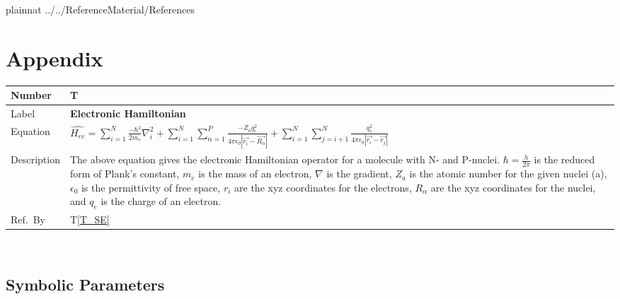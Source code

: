 \documentclass[12pt]{article}
\newcommand{\colAwidth}{0.13\textwidth}
\newcommand{\colBwidth}{0.82\textwidth}
\newcounter{theorynum} %
\newcommand{\tref}[1]{T\ref{#1}}
\begin{document}
\newpage

 {plainnat}
%
 {../../ReferenceMaterial/References}

\newpage

\section{Appendix} \label{appendix}


\noindent
\begin{minipage}{\textwidth}
	\renewcommand*{\arraystretch}{1.5}
	\begin{tabular}{| p{\colAwidth} | p{\colBwidth}|}
		\hline
		\rowcolor[gray]{0.9}
		Number & T{theorynum}\thetheorynum \label{T_HAMEE}\\	
		\hline
		Label&\bf Electronic Hamiltonian \\
		\hline
		Equation&  $\hat{H_{ee}} = 
		\sum\limits_{i=1}^{N}\frac{-\hbar^2}{2m_e}\nabla_i^2 + 
		\sum\limits_{i=1}^{N} 
		\sum\limits_{\alpha=1}^{P}\frac{-Z_a 
			q_e^2}{4\pi\epsilon_0|\overrightarrow{r_i}-\overrightarrow{R_\alpha}|}
			 + 
		\sum\limits_{i=1}^{N}\sum\limits_{j=i+1}^{N}\frac{q_e^2}{4\pi\epsilon_0|\overrightarrow{r_i}-\overrightarrow{r_j}|}
		$ \\
		\hline
		Description & 
		The above equation gives the electronic 
		Hamiltonian operator for a 
		molecule with N-\ce{e-} and P-nuclei. $\hbar = \frac{h}{2\pi}$ is the 
		reduced form of Plank's constant, $m_e$ is the mass of an electron, 
		$\nabla$ is the gradient, $Z_a$ is the atomic number for the given 
		nuclei (a), $\epsilon_0$ is the permittivity of free space, $r_i$ are 
		the 
		xyz coordinates for the electrons, $R_\alpha$ are the xyz coordinates 
		for the nuclei, and $q_e$ is the charge of an electron.
		\\
		\hline
		Ref.\ By & \tref{T_SE}\\
		\hline
	\end{tabular}
\end{minipage}\\

\subsection{Symbolic Parameters}

\end{document}
